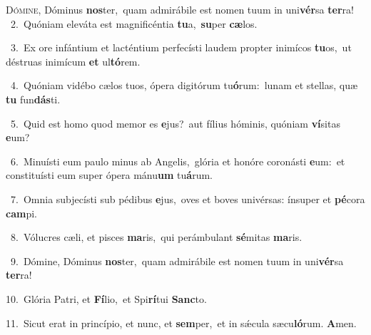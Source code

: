 \lettrine{\initial\textcolor{\initialcolor}{D}}{ómine,} Dóminus \textbf{nos}\-ter,~\star quam admirábile est nomen tuum in uni\-\textbf{vér}\-sa \textbf{ter}\-ra!\\
{\numbfont\textcolor{\numbcolor}{~2.}}~Quóniam eleváta est magnificéntia \textbf{tu}\-a,~\star \textbf{su}\-per \textbf{cæ}\-los.\par
{\numbfont\textcolor{\numbcolor}{~3.}}~Ex ore infántium et lacténtium perfecísti laudem propter inimícos \textbf{tu}\-os,~\star ut déstruas inimícum \textbf{et} ul\-\textbf{tó}\-rem.\par
{\numbfont\textcolor{\numbcolor}{~4.}}~Quóniam vidébo cælos tuos, ópera digitórum tu\-\textbf{ó}\-rum:~\star lunam et stellas, quæ \textbf{tu} fun\-\textbf{dás}\-ti.\par
{\numbfont\textcolor{\numbcolor}{~5.}}~Quid est homo quod memor es \textbf{e}\-jus?~\star aut fílius hóminis, quóniam \textbf{ví}\-sitas \textbf{e}\-um?\par
{\numbfont\textcolor{\numbcolor}{~6.}}~Minuísti eum paulo minus ab Angelis,~\dagger glória et honóre coronásti \textbf{e}\-um:~\star et constituísti eum super ópera mánu\textbf{um} tu\-\textbf{á}\-rum.\par
{\numbfont\textcolor{\numbcolor}{~7.}}~Omnia subjecísti sub pédibus \textbf{e}\-jus,~\star oves et boves univérsas: ínsuper et \textbf{pé}\-cora \textbf{cam}\-pi.\par
{\numbfont\textcolor{\numbcolor}{~8.}}~Vólucres cæli, et pisces \textbf{ma}\-ris,~\star qui perámbulant \textbf{sé}\-mitas \textbf{ma}\-ris.\par
{\numbfont\textcolor{\numbcolor}{~9.}}~Dómine, Dóminus \textbf{nos}\-ter,~\star quam admirábile est nomen tuum in uni\-\textbf{vér}\-sa \textbf{ter}\-ra!\par
{\numbfont\textcolor{\numbcolor}{10.}}~Glória Patri, et \textbf{Fí}\-lio,~\star et Spi\-\textbf{rí}\-tui \textbf{Sanc}\-to.\par
{\numbfont\textcolor{\numbcolor}{11.}}~Sicut erat in princípio, et nunc, et \textbf{sem}\-per,~\star et in sǽcula sæcu\-\textbf{ló}\-rum. \textbf{A}\-men.\par
